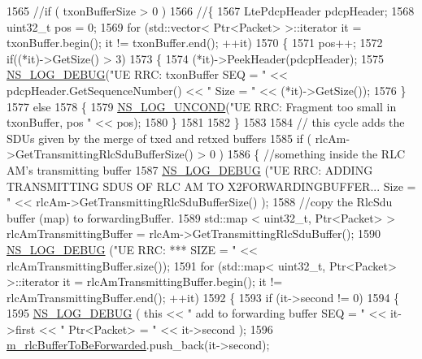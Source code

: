 \begin{DoxyCode}
1565     \textcolor{comment}{//if ( txonBufferSize > 0 )}
1566     \textcolor{comment}{//\{}
1567       LtePdcpHeader pdcpHeader;
1568       uint32\_t pos = 0;
1569       \textcolor{keywordflow}{for} (std::vector< Ptr<Packet> >::iterator it = txonBuffer.begin(); it != txonBuffer.end(); ++it)
1570       \{
1571         pos++;
1572         \textcolor{keywordflow}{if}((*it)->GetSize() > 3) 
1573         \{
1574           (*it)->PeekHeader(pdcpHeader);
1575           \hyperlink{group__logging_ga413f1886406d49f59a6a0a89b77b4d0a}{NS\_LOG\_DEBUG}(\textcolor{stringliteral}{"UE RRC: txonBuffer SEQ = "} << pdcpHeader.GetSequenceNumber() << \textcolor{stringliteral}{" Size
       = "} << (*it)->GetSize());
1576         \}
1577         \textcolor{keywordflow}{else}
1578         \{
1579           \hyperlink{log-macros-disabled_8h_a0b36e5e182b37194f85ef1c5e979fb2e}{NS\_LOG\_UNCOND}(\textcolor{stringliteral}{"UE RRC: Fragment too small in txonBuffer, pos "} << pos);
1580         \}
1581           
1582       \}
1583 
1584       \textcolor{comment}{// this cycle adds the SDUs given by the merge of txed and retxed buffers}
1585       \textcolor{keywordflow}{if} ( rlcAm->GetTransmittingRlcSduBufferSize() > 0 )
1586       \{ \textcolor{comment}{//something inside the RLC AM's transmitting buffer }
1587         \hyperlink{group__logging_ga413f1886406d49f59a6a0a89b77b4d0a}{NS\_LOG\_DEBUG} (\textcolor{stringliteral}{"UE RRC: ADDING TRANSMITTING SDUS OF RLC AM TO X2FORWARDINGBUFFER... Size
       = "} << rlcAm->GetTransmittingRlcSduBufferSize() );
1588         \textcolor{comment}{//copy the RlcSdu buffer (map) to forwardingBuffer.}
1589         std::map < uint32\_t, Ptr<Packet> > rlcAmTransmittingBuffer = rlcAm->GetTransmittingRlcSduBuffer();
1590         \hyperlink{group__logging_ga413f1886406d49f59a6a0a89b77b4d0a}{NS\_LOG\_DEBUG} (\textcolor{stringliteral}{"UE RRC:  *** SIZE = "} << rlcAmTransmittingBuffer.size());
1591         \textcolor{keywordflow}{for} (std::map< uint32\_t, Ptr<Packet> >::iterator it = rlcAmTransmittingBuffer.begin(); it != 
      rlcAmTransmittingBuffer.end(); ++it)
1592         \{
1593           \textcolor{keywordflow}{if} (it->second != 0)
1594           \{
1595             \hyperlink{group__logging_ga413f1886406d49f59a6a0a89b77b4d0a}{NS\_LOG\_DEBUG} ( \textcolor{keyword}{this} << \textcolor{stringliteral}{" add to forwarding buffer SEQ = "} << it->first << \textcolor{stringliteral}{"
       Ptr<Packet> = "} << it->second );
1596             \hyperlink{classns3_1_1LteUeRrc_acf565bc650023495082a94923956fb1a}{m\_rlcBufferToBeForwarded}.push\_back(it->second);

\end{DoxyCode}
